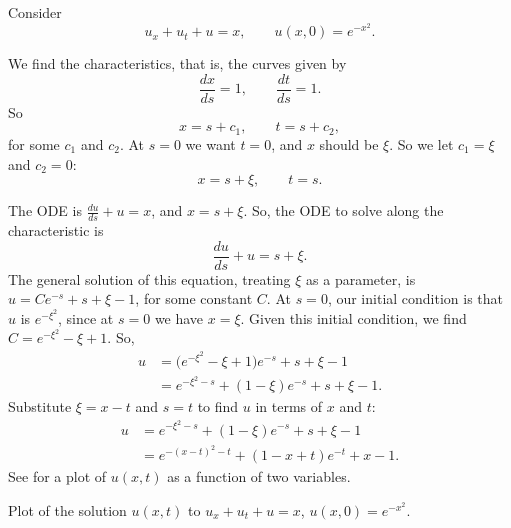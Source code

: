 \documentclass{ximera}
\begin{document}
\begin{example}
    Consider
    \begin{equation*}
        u_x + u_t + u = x, \qquad u(x,0) = e^{-x^2} .
    \end{equation*}
\end{example}
\begin{exampleSol}
    We find the characteristics, that is, the curves given by
    \begin{equation*}
        \frac{dx}{ds} = 1, \qquad \frac{dt}{ds} = 1 .
    \end{equation*}
    So
    \begin{equation*}
        x = s + c_1, \qquad t = s+ c_2 ,
    \end{equation*}
    for some $c_1$ and $c_2$. At $s=0$ we want $t=0$, and $x$ should be $\xi$.  So we let $c_1 = \xi$ and $c_2 = 0$:
    \begin{equation*}
        x = s + \xi, \qquad t = s .
    \end{equation*}
    
    The ODE is $\frac{du}{ds} + u = x$, and $x = s+\xi$. So, the ODE to solve along the characteristic is
    \begin{equation*}
        \frac{du}{ds} + u = s+ \xi .
    \end{equation*}
    The general solution of this equation, treating $\xi$ as a parameter, is $u = C e^{-s}+s+\xi-1$, for some constant $C$. At $s=0$, our initial condition is that $u$ is $e^{-\xi^2}$, since at $s=0$ we have $x=\xi$. Given this initial condition, we find $C=e^{-\xi^2} - \xi +1$.  So,
    \begin{equation*}
        \begin{split}
            u & = \bigl(e^{-\xi^2} - \xi +1\bigr) e^{-s}+s+\xi-1 \\
            & = e^{-\xi^2-s} + (1 - \xi) e^{-s} +s+\xi-1 .
        \end{split}
    \end{equation*}
    Substitute $\xi = x-t$ and $s=t$ to find $u$ in terms of $x$ and $t$:
    \begin{equation*}
        \begin{split}
            u
            & = e^{-\xi^2-s} + (1 - \xi) e^{-s} +s+\xi-1 \\
            & = e^{-{(x-t)}^2-t} + (1 - x + t) e^{-t} +x-1 .
        \end{split}
    \end{equation*}
    See  for a plot of $u(x,t)$ as a function of two variables.
    \begin{myfig}
        \capstart
        \caption{Plot of the solution $u(x,t)$ to $u_x + u_t + u = x$,  $u(x,0) = e^{-x^2}$.\label{fopde:surfaceplot}}
    \end{myfig}
\end{exampleSol}
\end{document}
